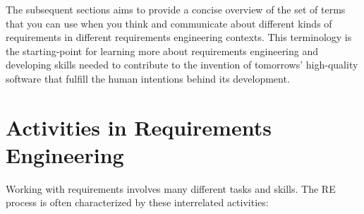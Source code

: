The subsequent sections aims to provide a concise overview of the set of terms that you can use when you think and communicate about different kinds of requirements in different requirements engineering contexts. This terminology is the starting-point for learning more about requirements engineering and developing skills needed to contribute to the invention of tomorrows' high-quality software that fulfill the human intentions behind its development.

\section*{Activities in Requirements Engineering}

Working with requirements involves many different tasks and skills. The RE process is often characterized by these interrelated activities: 

